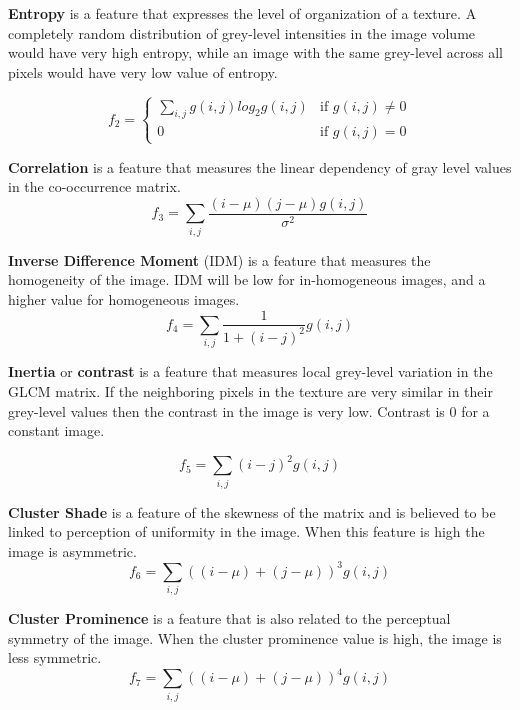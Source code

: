 \documentclass{InsightArticle}
\begin{document}
\textbf{Entropy} is a feature that expresses the level of organization of a texture. A completely random distribution of grey-level intensities in the image volume would have very high entropy, while an image with the same grey-level across all pixels would have very low value of entropy.

\begin{equation} \label{eqn:ShapeInfluenceTerm}
f_2 = 
  \begin{cases} 
     \sum_{i,j}\nolimits g(i, j)log_2g(i,j)  & \text{if } g(i, j) \neq 0 \\
     0                                       & \text{if } g(i, j) = 0
  \end{cases}
\end{equation}

\textbf{Correlation} is a feature that measures the linear dependency of gray level values in the co-occurrence matrix.
\begin{equation} \label{eqn:ShapeInfluenceTerm}
f_3 = \sum_{i,j}\nolimits \frac{(i-\mu)(j-\mu)g(i, j)}{\sigma^2} 
\end{equation}

\textbf{Inverse Difference Moment} (IDM) is a feature that measures the homogeneity of the image.  IDM will be low for in-homogeneous images, and a higher value for homogeneous images.
\begin{equation} \label{eqn:ShapeInfluenceTerm}
f_4 = \sum_{i,j}\nolimits \frac{1}{1+(i-j)^2}g(i, j)
\end{equation}

\textbf{Inertia} or \textbf{contrast} is a feature that measures local grey-level variation in the GLCM matrix. If the neighboring pixels in the texture are very similar in their grey-level values then the contrast in the image is very low. Contrast is 0 for a constant image. 

\begin{equation} \label{eqn:ShapeInfluenceTerm}
f_5 = \sum_{i,j}\nolimits (i-j)^2g(i, j)
\end{equation}

\textbf{Cluster Shade} is a feature of the skewness of the matrix and is believed to be linked to perception of uniformity in the image. When this feature is high the image is asymmetric.
\begin{equation} \label{eqn:ShapeInfluenceTerm}
f_6 = \sum_{i,j}\nolimits ((i - \mu)+(j-\mu))^3g(i, j)
\end{equation}

\textbf{Cluster Prominence} is a feature that is also related to the perceptual symmetry of the image. When the cluster prominence value is high, the image is less symmetric. 
\begin{equation} \label{eqn:ShapeInfluenceTerm}
f_7 = \sum_{i,j}\nolimits ((i - \mu)+(j-\mu))^4g(i, j)
\end{equation}
\end{document}
